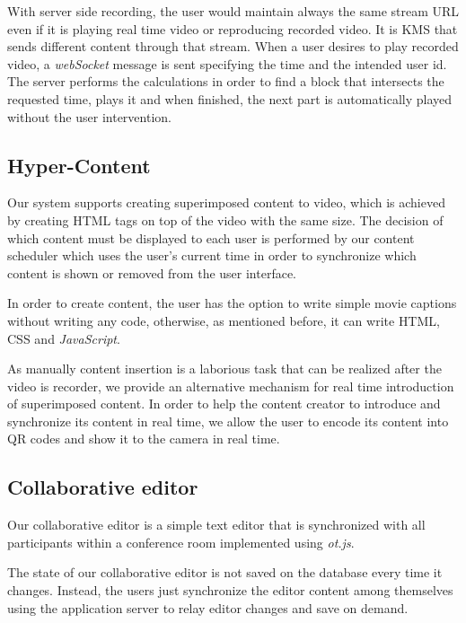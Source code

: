 \documentclass[conference,compsoc,a4paper]{IEEEtran}
\begin{document}
	With server side recording, the user would maintain always the same stream \gls{URL} even if it is playing real time video or reproducing recorded video. It is \gls{KMS} that sends different content through that stream. When a user desires to play recorded video, a \emph{webSocket} message is sent specifying the time and the intended user id. The server performs the calculations in order to find a block that intersects the requested time, plays it and when finished, the next part is automatically played without the user intervention.



\subsection{Hyper-Content}

	Our system supports creating superimposed content to video, which is achieved by creating \gls{HTML} tags on top of the video  with the same size. The decision of which content must be displayed to each user is performed by our content scheduler which uses the user's current time in order to synchronize which content is shown or removed from the user interface.

	In order to create content, the user has the option to write simple movie captions without writing any code, otherwise, as mentioned before, it can write \gls{HTML}, \gls{CSS} and \emph{JavaScript}.

	As manually content insertion is a laborious task that can be realized after the video is recorder, we provide an alternative mechanism for real time introduction of superimposed content.	In order to help the content creator to introduce and synchronize its content in real time, we allow the user to encode its content into \gls{QR} codes and show it to the camera in real time.


\subsection{Collaborative editor}

Our collaborative editor is a simple text editor that is synchronized with all participants within a conference room implemented using \emph{ot.js}.

The state of our collaborative editor is not saved on the database every time it changes. Instead, the users just synchronize the editor content among themselves using the application server to relay editor changes and save on demand.
\end{document}
